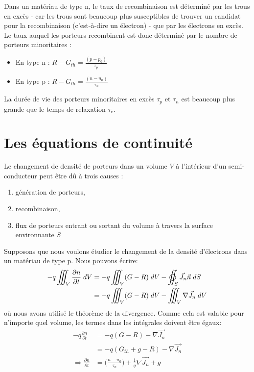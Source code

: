 Dans un matériau de type n, le taux de recombinaison est déterminé par les trous en excès - car les trous sont beaucoup plus susceptibles de trouver un candidat pour la recombinaison (c'est-à-dire un électron) - que par les électrons en excès. Le taux auquel les porteurs recombinent est donc déterminé par le nombre de porteurs minoritaires :
\begin{itemize}
	\item En type n : $R - G_{th} = \frac{(p-p_0)}{\tau_p}$
	\item En type p : $R - G_{th} = \frac{(n-n_0)}{\tau_n}$
\end{itemize}
La durée de vie des porteurs minoritaires en excès $\tau_p$ et $\tau_n$ est beaucoup plus grande que le temps de relaxation $\tau_e$.
\section{Les équations de continuité}
Le changement de densité de porteurs dans un volume $V$ à l'intérieur d'un semi-conducteur peut être dû à trois causes :
\begin{enumerate}
	\item génération de porteurs,
	\item recombinaison,
	\item flux de porteurs entrant ou sortant du volume à travers la surface environnante $S$
\end{enumerate}
Supposons que nous voulons étudier le changement de la densité d'électrons dans un matériau de type p. Nous pouvons écrire:
\begin{equation} 
	\begin{split}
		-q \iiint_V \frac{\partial n}{\partial t} \; dV &= -q \iiint_V (G-R) \; dV - \varoiint_S \vec{J_n} \vec{n} \; dS \\
		 &= -q \iiint_V (G-R) \; dV - \iiint_V \nabla \vec{J_n}  \; dV \\
	\end{split}
\end{equation} 
où nous avons utilisé le théorème de la divergence. Comme cela est valable pour n'importe quel volume, les termes dans les intégrales doivent être égaux:
\begin{equation} 
	\begin{split}
		-q \frac{\partial n}{\partial t} &= -q (G-R) - \nabla \vec{J_n}\\
										 &= -q (G_{th} + g - R) - \nabla \vec{J_n}\\
	\Rightarrow	\frac{\partial n}{\partial t}	 &= \Big(\frac{n-n_0}{\tau_n}\Big) + \frac{1}{q}\nabla \vec{J_n} + g\\
	\end{split}
\end{equation}
